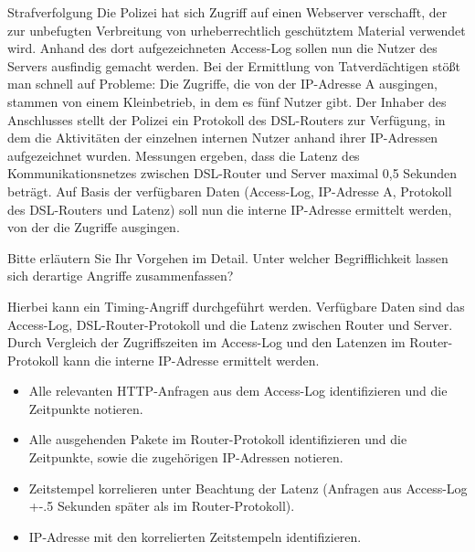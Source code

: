 \documentclass{article}
\begin{document}
\begin{exercise}{Strafverfolgung}
  Die Polizei hat sich Zugriff auf einen Webserver verschafft, der zur unbefugten Verbreitung von urheberrechtlich geschütztem Material verwendet wird. Anhand des dort aufgezeichneten Access-Log sollen nun die Nutzer des Servers ausfindig gemacht werden. Bei der Ermittlung von Tatverdächtigen stößt man schnell auf Probleme: Die Zugriffe, die von der IP-Adresse A ausgingen, stammen von einem Kleinbetrieb, in dem es fünf Nutzer gibt. Der Inhaber des Anschlusses stellt der Polizei ein Protokoll des DSL-Routers zur Verfügung, in dem die Aktivitäten der einzelnen internen Nutzer anhand ihrer IP-Adressen aufgezeichnet wurden. Messungen ergeben, dass die Latenz des Kommunikationsnetzes zwischen DSL-Router und Server maximal 0,5 Sekunden beträgt. Auf Basis der verfügbaren Daten (Access-Log, IP-Adresse A, Protokoll des DSL-Routers und Latenz) soll nun die interne IP-Adresse ermittelt werden, von der die Zugriffe ausgingen.

  Bitte erläutern Sie Ihr Vorgehen im Detail. Unter welcher Begrifflichkeit lassen sich derartige Angriffe zusammenfassen?

  \begin{solution}
    Hierbei kann ein Timing-Angriff durchgeführt werden. Verfügbare Daten sind das Access-Log, DSL-Router-Protokoll und die Latenz zwischen Router und Server. Durch Vergleich der Zugriffszeiten im Access-Log und den Latenzen im Router-Protokoll kann die interne IP-Adresse ermittelt werden.
    \begin{itemize}
      \item Alle relevanten HTTP-Anfragen aus dem Access-Log identifizieren und die Zeitpunkte notieren.
      \item Alle ausgehenden Pakete im Router-Protokoll identifizieren und die Zeitpunkte, sowie die zugehörigen IP-Adressen notieren.
      \item Zeitstempel korrelieren unter Beachtung der Latenz (Anfragen aus Access-Log +-.5 Sekunden später als im Router-Protokoll).
      \item IP-Adresse mit den korrelierten Zeitstempeln identifizieren.
    \end{itemize}
  \end{solution}
\end{exercise}
\end{document}
